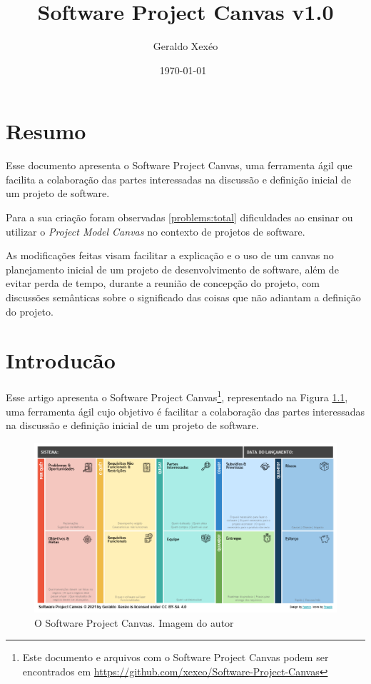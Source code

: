 \documentclass[fontsize=12pt, a4paper,pagesize=auto,toc=listof, ,twoside,chapterprefix=false,appendixprefix=true,open=right]{scrbook}
\title{Software Project Canvas v1.0}
\author{Geraldo Xexéo}
\date{\today \ \DTMcurrenttime }
\begin{document}
\maketitle


\tableofcontents
\listoffigures

\newpage

\chapter*{Resumo}
\hspace*{\parindent}Esse documento apresenta o Software Project Canvas, uma ferramenta ágil que facilita a colaboração das partes interessadas na  discussão e definição inicial de um projeto de software.

Para a sua  criação foram observadas \ref{problems:total} dificuldades  ao ensinar ou utilizar o \textit{Project Model Canvas} no contexto de projetos de software.

As modificações feitas visam facilitar a explicação e o uso de um canvas no planejamento inicial de um projeto de desenvolvimento de software, além de evitar perda de tempo, durante a reunião de concepção do projeto, com discussões semânticas sobre o significado das coisas que não adiantam a definição do projeto.

\chapter{Introducão}

Esse artigo apresenta o Software Project Canvas\footnote{Este documento e arquivos com o Software Project Canvas podem ser encontrados em \url{https://github.com/xexeo/Software-Project-Canvas}}, representado na Figura \ref{fig:spc}, uma ferramenta ágil cujo objetivo é facilitar a colaboração das partes interessadas na  discussão e definição inicial de um projeto de software.

\begin{figure}[hbt]
    \centering
    \includegraphics[width=\textwidth]{imagens/Software Project Canvas Yasmin 1.png}
    \caption{O Software Project Canvas. Imagem do autor}
    \label{fig:spc}
\end{figure}
\end{document}
